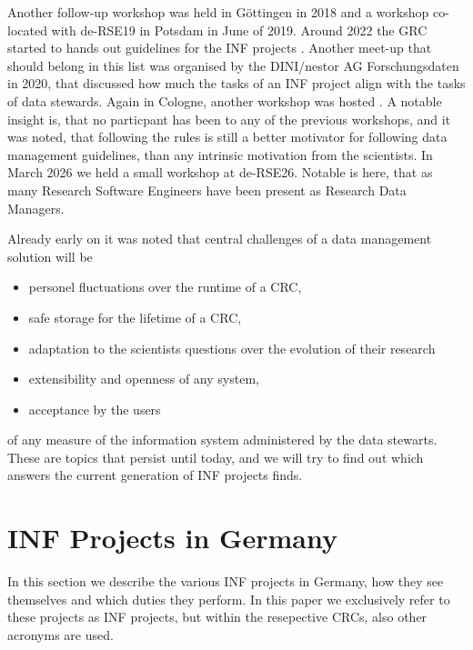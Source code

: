 \documentclass{eceasst}
\begin{document}
Another follow-up workshop was held in Göttingen in 2018 \cite{Roertgen2019} and a workshop co-located with de-RSE19 in Potsdam in June of 2019.
Around 2022 the GRC started to hands out guidelines for the INF projects \cite{bastian_2025}.
Another meet-up that should belong in this list was organised by the DINI/nestor AG Forschungsdaten in 2020\cite{Rizzolli_2021},
that discussed how much the tasks of an INF project align with the tasks of data stewards.
Again in Cologne, another workshop was hosted \cite{bastian_2025}. A notable insight is, that no particpant has been to any
of the previous workshops, and it was noted, that following the rules is still a better motivator for following data
management guidelines, than any intrinsic motivation from the scientists.
In March 2026 we held a small workshop at de-RSE26. Notable is here, that as many Research Software Engineers have been present
as Research Data Managers.

Already early on \cite{mueckschel2006} it was noted that central challenges of a data management solution will be
\begin{itemize}
 \item personel fluctuations over the runtime of a CRC,
 \item safe storage for the lifetime of a CRC,
 \item adaptation to the scientists questions over the evolution of their research
 \item extensibility and openness of any system,
 \item acceptance by the users
\end{itemize}
of any measure of the information system administered by the data stewarts.
These are topics that persist until today,
and we will try to find out which answers the current generation of INF projects finds.


\section{INF Projects in Germany}
In this section we describe the various INF projects in Germany, how they see themselves and which duties they perform.
In this paper we exclusively refer to these projects as INF projects, but within the resepective CRCs, also other acronyms are used.
\end{document}
